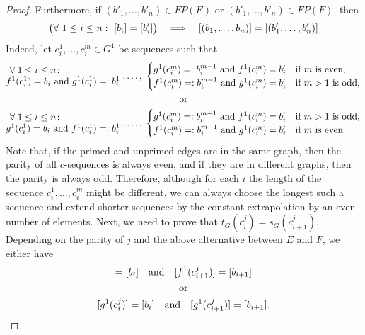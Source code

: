 \documentclass[12pt,times,a4paper]{amsart}
\numberwithin{equation}{section}
\def\text{\hbox}
\numberwithin{equation}{section}
\begin{document}
\begin{proof}
Furthermore, if $(b'_1,\ldots,b'_n)\in FP(E)$ or $(b'_1,\ldots,b'_n)\in FP(F)$, then 
\begin{equation}\label{implication}
\big{(}\forall~1\leq i\leq n:~[b_i]=[b'_i]\big{)}\quad \Longrightarrow\quad [(b_1,\ldots,b_n)]=[(b'_1,\ldots,b'_n)]
\end{equation}
Indeed, let $c^1_i,\ldots,c^{m}_i\in G^1$ be  sequences such that
\begin{gather}
\begin{matrix}
\forall\;1\leq i\leq n\colon\phantom{xxxxxxxxxx}\\
 f^1(c^1_i)=b_i\text{ and } g^1(c^1_i)=:b^1_i
\end{matrix}
\;,\ldots,\;
\begin{cases}
g^1(c^{m}_i)=:b^{m-1}_i\text{ and } f^1(c^{m}_i)=b'_i&\text{if $m$ is even},\\
f^1(c^{m}_i)=:b^{m-1}_i\text{ and } g^1(c^{m}_i)=b'_i&\text{if $m> 1$ is odd},
\end{cases}\nonumber\\
\text{or}\nonumber\\
\begin{matrix}
\forall\;1\leq i\leq n\colon\phantom{xxxxxxxxxx}\\
 g^1(c^1_i)=b_i\text{ and } f^1(c^1_i)=:b^1_i
\end{matrix}
\;,\ldots,\;
\begin{cases}
g^1(c^{m}_i)=:b^{m-1}_i\text{ and } f^1(c^{m}_i)=b'_i&\text{if $m>1$ is odd},\\
f^1(c^{m}_i)=:b^{m-1}_i\text{ and } g^1(c^{m}_i)=b'_i&\text{if $m$ is even}.
\end{cases}
\end{gather}
Note that, if the primed and unprimed edges are in the same graph, then the parity of all $c$-sequences is always even, and if they are in different graphs, then the parity is always odd. Therefore, although for each $i$ the length of the sequence $c^1_i,\ldots,c^{m}_i$ might be
different, we can always choose the longest such a sequence and extend shorter sequences by the constant extrapolation by an even number of elements. Next, we need to prove that $t_G(c^j_i)=s_G(c^j_{i+1})$. 
Depending on the parity of $j$ and the
above alternative between $E$ and $F$, we either have 
\begin{gather}
[f^1(c^j_i)]=[b_i]\quad\text{and}\quad [f^1(c^j_{i+1})]=[b_{i+1}]\nonumber\\
\text{or}\nonumber\\
[g^1(c^j_i)]=[b_i]\quad\text{and}\quad[g^1(c^j_{i+1})]=[b_{i+1}].

\end{gather}
\end{proof}
\end{document}
